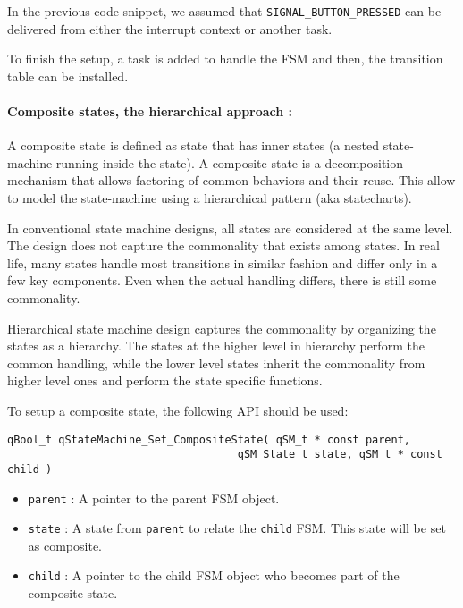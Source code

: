 In the previous code snippet, we assumed that \lstinline{SIGNAL_BUTTON_PRESSED} can be delivered from either the interrupt context or another task.

To finish the setup, a task is added to handle the FSM and then, the transition table can be installed.
\medskip



\paragraph{Composite states, the hierarchical approach : } A composite state is defined as state that has inner states (a nested state-machine running inside the state). A composite state is a decomposition mechanism that allows factoring of common behaviors and their reuse. This allow to model the state-machine using a hierarchical pattern (aka statecharts). 

In conventional state machine designs, all states are considered at the same level. The design does not capture the commonality that exists among states. In real life, many states handle most transitions in similar fashion and differ only in a few key components. Even when the actual handling differs, there is still some commonality.

Hierarchical state machine design captures the commonality by organizing the states as a hierarchy. The states at the higher level in hierarchy perform the common handling, while the lower level states inherit the commonality from higher level ones and perform the state specific functions. 

To setup a composite state, the following API should be used:
\medskip

\begin{lstlisting}[style=CStyle]
qBool_t qStateMachine_Set_CompositeState( qSM_t * const parent, 
                                    qSM_State_t state, qSM_t * const child )
\end{lstlisting}

\begin{itemize}
    \item \lstinline{parent} : A pointer to the parent FSM object.
    \item \lstinline{state} : A state from \lstinline{parent} to relate the \lstinline{child} FSM. This state will be set as composite.
    \item \lstinline{child} : A pointer to the child FSM object who becomes part of the composite state.
\end{itemize}

